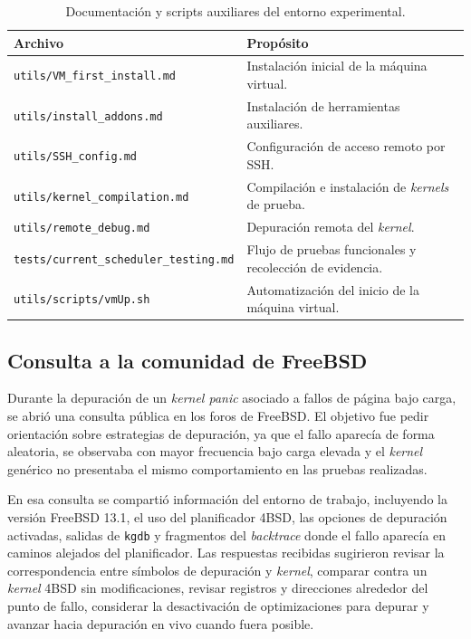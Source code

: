 \begin{table}[H]
    \centering
    \small
    \begin{tabular}{|p{}|p{}|}
        \hline
        \textbf{Archivo} & \textbf{Propósito} \\
        \hline
        \texttt{utils/VM\_first\_install.md} & Instalación inicial de la máquina virtual. \\
        \hline
        \texttt{utils/install\_addons.md} & Instalación de herramientas auxiliares. \\
        \hline
        \texttt{utils/SSH\_config.md} & Configuración de acceso remoto por SSH. \\
        \hline
        \texttt{utils/kernel\_compilation.md} & Compilación e instalación de \textit{kernels} de prueba. \\
        \hline
        \texttt{utils/remote\_debug.md} & Depuración remota del \textit{kernel}. \\
        \hline
        \texttt{tests/current\_scheduler\_testing.md} & Flujo de pruebas funcionales y recolección de evidencia. \\
        \hline
        \texttt{utils/scripts/vmUp.sh} & Automatización del inicio de la máquina virtual. \\
        \hline
    \end{tabular}
    \caption{Documentación y scripts auxiliares del entorno experimental.}
    \label{tabla:documentacion_automatizacion}
\end{table}

\subsection{Consulta a la comunidad de FreeBSD}

Durante la depuración de un \textit{kernel panic} asociado a fallos de página bajo carga, se abrió una consulta pública en los foros de FreeBSD\cite{bib6}. El objetivo fue pedir orientación sobre estrategias de depuración, ya que el fallo aparecía de forma aleatoria, se observaba con mayor frecuencia bajo carga elevada y el \textit{kernel} genérico no presentaba el mismo comportamiento en las pruebas realizadas.\par

En esa consulta se compartió información del entorno de trabajo, incluyendo la versión FreeBSD 13.1, el uso del planificador 4BSD, las opciones de depuración activadas, salidas de \texttt{kgdb} y fragmentos del \textit{backtrace} donde el fallo aparecía en caminos alejados del planificador. Las respuestas recibidas sugirieron revisar la correspondencia entre símbolos de depuración y \textit{kernel}, comparar contra un \textit{kernel} 4BSD sin modificaciones, revisar registros y direcciones alrededor del punto de fallo, considerar la desactivación de optimizaciones para depurar y avanzar hacia depuración en vivo cuando fuera posible.\par

